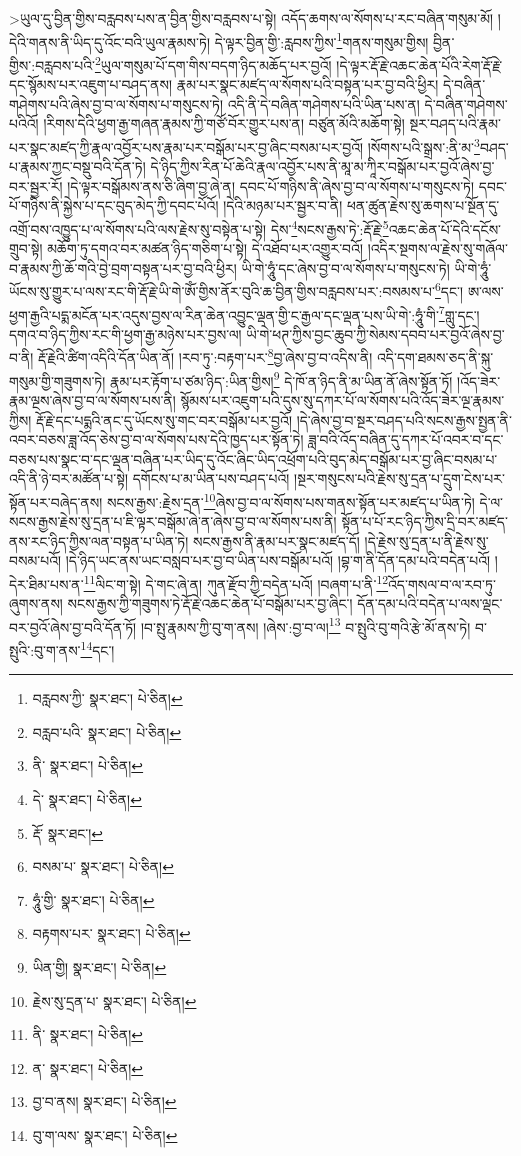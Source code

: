  >ཡུལ་དུ་བྱིན་གྱིས་བརླབས་པས་ན་བྱིན་གྱིས་བརླབས་པ་སྟེ། འདོད་ཆགས་ལ་སོགས་པ་རང་བཞིན་གསུམ་མོ། །དེའི་གནས་ནི་ཡིད་དུ་འོང་བའི་ཡུལ་རྣམས་ཏེ། དེ་ལྟར་བྱིན་གྱི་:རླབས་ཀྱིས་\footnote{བརླབས་ཀྱི་  སྣར་ཐང་།  པེ་ཅིན། }གནས་གསུམ་གྱིས། བྱིན་གྱིས་:བརླབས་པའི་\footnote{བརླབ་པའི་  སྣར་ཐང་།  པེ་ཅིན། }ཡུལ་གསུམ་པོ་དག་གིས་བདག་ཉིད་མཆོད་པར་བྱའོ། །དེ་ལྟར་རྡོ་རྗེ་འཆང་ཆེན་པོའི་རེག་རྡོ་རྗེ་དང་སྙོམས་པར་འཇུག་པ་བཤད་ནས། རྣམ་པར་སྣང་མཛད་ལ་སོགས་པའི་བསྟན་པར་བྱ་བའི་ཕྱིར། དེ་བཞིན་གཤེགས་པའི་ཞེས་བྱ་བ་ལ་སོགས་པ་གསུངས་ཏེ། འདི་ནི་དེ་བཞིན་གཤེགས་པའི་ཡིན་པས་ན། དེ་བཞིན་གཤེགས་པའིའོ། །རིགས་དེའི་ཕྱག་རྒྱ་གཞན་རྣམས་ཀྱི་གཙོ་བོར་གྱུར་པས་ན། བཙུན་མོའི་མཆོག་སྟེ། སྔར་བཤད་པའི་རྣམ་པར་སྣང་མཛད་ཀྱི་རྣལ་འབྱོར་པས་རྣམ་པར་བསྒོམ་པར་བྱ་ཞིང་བསམ་པར་བྱའོ། །སོགས་པའི་སྒྲས་:ནི་མ་\footnote{ནི་  སྣར་ཐང་།  པེ་ཅིན། }བཤད་པ་རྣམས་ཀྱང་བསྡུ་བའི་དོན་ཏེ། དེ་ཉིད་ཀྱིས་རིན་པོ་ཆེའི་རྣལ་འབྱོར་པས་ནི་མཱ་མ་ཀཱིར་བསྒོམ་པར་བྱའོ་ཞེས་བྱ་བར་སྦྱར་རོ། །དེ་ལྟར་བསྒོམས་ནས་ཅི་ཞིག་བྱ་ཞེ་ན། དབང་པོ་གཉིས་ནི་ཞེས་བྱ་བ་ལ་སོགས་པ་གསུངས་ཏེ། དབང་པོ་གཉིས་ནི་སྐྱེས་པ་དང་བུད་མེད་ཀྱི་དབང་པོའོ། །དེའི་མཉམ་པར་སྦྱར་བ་ནི། ཕན་ཚུན་རྗེས་སུ་ཆགས་པ་སྔོན་དུ་འགྲོ་བས་འཁྱུད་པ་ལ་སོགས་པའི་ལས་རྗེས་སུ་བསྟེན་པ་སྟེ། དེས་\footnote{དེ་  སྣར་ཐང་།  པེ་ཅིན། }སངས་རྒྱས་ཏེ་:རྡོ་རྗེ་\footnote{རྡོ་  སྣར་ཐང་། }འཆང་ཆེན་པོ་དེའི་དངོས་གྲུབ་སྟེ། མཆོག་ཏུ་དགའ་བར་མཚན་ཉིད་གཅིག་པ་སྟེ། དེ་འཐོབ་པར་འགྱུར་བའོ། །འདིར་སྔགས་ལ་རྗེས་སུ་གཞོལ་བ་རྣམས་ཀྱི་ཆོ་གའི་བྱེ་བྲག་བསྟན་པར་བྱ་བའི་ཕྱིར། ཡི་གེ་ཧཱུཾ་དང་ཞེས་བྱ་བ་ལ་སོགས་པ་གསུངས་ཏེ། ཡི་གེ་ཧཱུཾ་ཡོངས་སུ་གྱུར་པ་ལས་རང་གི་རྡོ་རྗེ་ཡི་གེ་ཨོཾ་གྱིས་ནོར་བུའི་ཆ་བྱིན་གྱིས་བརླབས་པར་:བསམས་པ་\footnote{བསམ་པ་  སྣར་ཐང་།  པེ་ཅིན། }དང་། ཨ་ལས་ཕྱག་རྒྱའི་པདྨ་མངོན་པར་འདུས་བྱས་ལ་རིན་ཆེན་འབྱུང་ལྡན་གྱི་ང་རྒྱལ་དང་ལྡན་པས་ཡི་གེ་:ཧཱུཾ་གི་\footnote{ཧཱུཾ་གྱི་  སྣར་ཐང་།  པེ་ཅིན། }གླུ་དང་། དགའ་བ་ཉིད་ཀྱིས་རང་གི་ཕྱག་རྒྱ་མཉེས་པར་བྱས་ལ། ཡི་གེ་ཕཊ་ཀྱིས་བྱང་ཆུབ་ཀྱི་སེམས་དབབ་པར་བྱའོ་ཞེས་བྱ་བ་ནི། རྡོ་རྗེའི་ཚིག་འདིའི་དོན་ཡིན་ནོ། །རབ་ཏུ་:བརྟག་པར་\footnote{བརྟགས་པར་  སྣར་ཐང་།  པེ་ཅིན། }བྱ་ཞེས་བྱ་བ་འདིས་ནི། འདི་དག་ཐམས་ཅད་ནི་སྐུ་གསུམ་གྱི་གཟུགས་ཏེ། རྣམ་པར་རྟོག་པ་ཙམ་ཉིད་:ཡིན་གྱིས།\footnote{ཡིན་གྱི།  སྣར་ཐང་།  པེ་ཅིན། } དེ་ཁོ་ན་ཉིད་ནི་མ་ཡིན་ནོ་ཞེས་སྟོན་ཏོ། །འོད་ཟེར་རྣམ་ལྔས་ཞེས་བྱ་བ་ལ་སོགས་པས་ནི། སྙོམས་པར་འཇུག་པའི་དུས་སུ་དཀར་པོ་ལ་སོགས་པའི་འོད་ཟེར་ལྔ་རྣམས་ཀྱིས། རྡོ་རྗེ་དང་པདྨའི་ནང་དུ་ཡོངས་སུ་གང་བར་བསྒོམ་པར་བྱའོ། །དེ་ཞེས་བྱ་བ་སྔར་བཤད་པའི་སངས་རྒྱས་སྤྱན་ནི་འབར་བཅས་ཟླ་འོད་ཅེས་བྱ་བ་ལ་སོགས་པས་དེའི་ཁྱད་པར་སྟོན་ཏེ། ཟླ་བའི་འོད་བཞིན་དུ་དཀར་པོ་འབར་བ་དང་བཅས་པས་སྣང་བ་དང་ལྡན་བཞིན་པར་ཡིད་དུ་འོང་ཞིང་ཡིད་འཕྲོག་པའི་བུད་མེད་བསྒོམ་པར་བྱ་ཞིང་བསམ་པ་འདི་ནི་ཉེ་བར་མཚོན་པ་སྟེ། དགོངས་པ་མ་ཡིན་པས་བཤད་པའོ། །སྔར་གསུངས་པའི་རྗེས་སུ་དྲན་པ་དྲུག་ངེས་པར་སྟོན་པར་བཞེད་ནས། སངས་རྒྱས་:རྗེས་དྲན་\footnote{རྗེས་སུ་དྲན་པ་  སྣར་ཐང་།  པེ་ཅིན། }ཞེས་བྱ་བ་ལ་སོགས་པས་གནས་སྟོན་པར་མཛད་པ་ཡིན་ཏེ། དེ་ལ་སངས་རྒྱས་རྗེས་སུ་དྲན་པ་ཇི་ལྟར་བསྒོམ་ཞེ་ན་ཞེས་བྱ་བ་ལ་སོགས་པས་ནི། སྟོན་པ་པོ་རང་ཉིད་ཀྱིས་དྲི་བར་མཛད་ནས་རང་ཉིད་ཀྱིས་ལན་བསྟན་པ་ཡིན་ཏེ། སངས་རྒྱས་ནི་རྣམ་པར་སྣང་མཛད་དོ། །དེ་རྗེས་སུ་དྲན་པ་ནི་རྗེས་སུ་བསམ་པའོ། །དེ་ཉིད་ཡང་ནས་ཡང་བསླབ་པར་བྱ་བ་ཡིན་པས་བསྒོམ་པའོ། །བྷ་ག་ནི་དོན་དམ་པའི་བདེན་པའོ། །དེར་ཐིམ་པས་ན་\footnote{ནི་  སྣར་ཐང་།  པེ་ཅིན། }ལིང་ག་སྟེ། དེ་གང་ཞེ་ན། ཀུན་རྫོབ་ཀྱི་བདེན་པའོ། །བཞག་པ་ནི་\footnote{ན་  སྣར་ཐང་།  པེ་ཅིན། }འོད་གསལ་བ་ལ་རབ་ཏུ་ཞུགས་ནས། སངས་རྒྱས་ཀྱི་གཟུགས་ཏེ་རྡོ་རྗེ་འཆང་ཆེན་པོ་བསྒོམ་པར་བྱ་ཞིང་། དོན་དམ་པའི་བདེན་པ་ལས་ལྡང་བར་བྱའོ་ཞེས་བྱ་བའི་དོན་ཏོ། །བ་སྤུ་རྣམས་ཀྱི་བུ་ག་ནས། །ཞེས་:བྱ་བ་ལ།\footnote{བྱ་བ་ནས།  སྣར་ཐང་།  པེ་ཅིན། } བ་སྤུའི་བུ་གའི་རྩེ་མོ་ནས་ཏེ། བ་སྤུའི་:བུ་ག་ནས་\footnote{བུ་ག་ལས་  སྣར་ཐང་།  པེ་ཅིན། }དང་། 